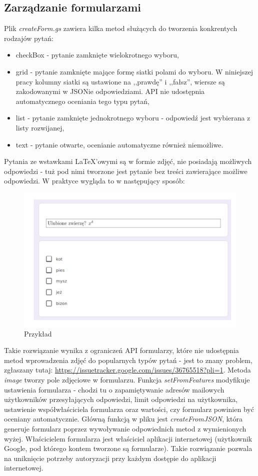 \subsection{Zarządzanie formularzami}
Plik \textit{createForm.gs} zawiera kilka metod służących do tworzenia konkrentych rodzajów pytań:
\begin{itemize}
\item checkBox - pytanie zamknięte wielokrotnego wyboru,
\item grid - pytanie zamknięte mające formę siatki polami do wyboru. W niniejszej pracy kolumny siatki są ustawione na ,,prawdę'' i ,,fałsz'', wiersze są zakodowanymi w JSONie odpowiedziami. API nie udostępnia automatycznego oceniania tego typu pytań,
\item list - pytanie zamknięte jednokrotnego wyboru - odpowiedź jest wybierana z listy rozwijanej,
\item text - pytanie otwarte, ocenianie automatyczne również niemożliwe.

\end{itemize}
Pytania ze wstawkami \LaTeX{}'owymi są w formie zdjęć, nie posiadają możliwych odpowiedzi - tuż pod nimi tworzone jest pytanie bez treści zawierające możliwe odpowiedzi. W praktyce wygląda to w następujący sposób:
\begin{figure}[H]
  \includegraphics{przyklad.png}
  \caption{Przykład}
  \label{fig:1}
\end{figure}
Takie rozwiązanie wynika z ograniczeń  API formularzy, które nie udostępnia metod wprowadzenia zdjęć do popularnych typów pytań - jest to znany problem, zgłaszany tutaj: \href{https://issuetracker.google.com/issues/36765518?pli=1}{https://issuetracker.google.com/issues/36765518?pli=1}. Metoda \textit{image} tworzy pole zdjęciowe w formularzu. 
Funkcja \textit{setFromFeatures} modyfikuje ustawienia formularza - chodzi tu o zapamiętywanie adresów mailowych użytkowników przesyłających odpowiedzi, limit odpowiedzi na użytkownika, ustawienie współwłaściciela formularza oraz wartości, czy formularz powinien być oceniany automatycznie.
\ind Główną funkcją w pliku jest \textit{createFromJSON}, która generuje formularz poprzez wywoływanie odpowiednich metod z wymienionych wyżej. Właścicielem formularza jest właściciel aplikacji internetowej (użytkownik Google, pod którego  kontem tworzone są formularze). Takie rozwiązanie pozwala na uniknięcie potrzeby autoryzacji przy każdym dostępie do aplikacji internetowej.

